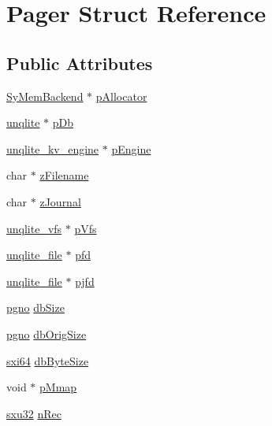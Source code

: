 \hypertarget{struct_pager}{\section{Pager Struct Reference}
\label{d0/dba/struct_pager}
}
\subsection*{Public Attributes}
\begin{DoxyCompactItemize}
\item 
\hyperlink{struct_sy_mem_backend}{Sy\-Mem\-Backend} $\ast$ \hyperlink{struct_pager_ac763b64b0ff65ebda65c6ddb4a79c673}{p\-Allocator}
\item 
\hyperlink{structunqlite}{unqlite} $\ast$ \hyperlink{struct_pager_af0cd7032701f31fc96e7912016c07aae}{p\-Db}
\item 
\hyperlink{structunqlite__kv__engine}{unqlite\-\_\-kv\-\_\-engine} $\ast$ \hyperlink{struct_pager_a15d841c0957a25122ad101ab6452ced0}{p\-Engine}
\item 
char $\ast$ \hyperlink{struct_pager_a2a55a044468f8658b7993e57087a5561}{z\-Filename}
\item 
char $\ast$ \hyperlink{struct_pager_ab36ce1f606c407ad3fc56a3651f5a319}{z\-Journal}
\item 
\hyperlink{structunqlite__vfs}{unqlite\-\_\-vfs} $\ast$ \hyperlink{struct_pager_af8726806e509aa9ffadbec33d8fd5db3}{p\-Vfs}
\item 
\hyperlink{structunqlite__file}{unqlite\-\_\-file} $\ast$ \hyperlink{struct_pager_af9208754978a6d024387dba841a161a4}{pfd}
\item 
\hyperlink{structunqlite__file}{unqlite\-\_\-file} $\ast$ \hyperlink{struct_pager_a08b938bade1e4ea6f8d5d1a828b692d3}{pjfd}
\item 
\hyperlink{unqlite_8c_a90bf132c9229151f7c29e84e592907cd}{pgno} \hyperlink{struct_pager_ab7ffb34750348f688f5aab803b20e99b}{db\-Size}
\item 
\hyperlink{unqlite_8c_a90bf132c9229151f7c29e84e592907cd}{pgno} \hyperlink{struct_pager_a701f357add2315f86d1529d41aa0d703}{db\-Orig\-Size}
\item 
\hyperlink{unqlite_8c_a7913a13763a99412223d5dfa1829dd73}{sxi64} \hyperlink{struct_pager_a1c9e52247b26f6df497c920d4aaac0c4}{db\-Byte\-Size}
\item 
void $\ast$ \hyperlink{struct_pager_ada2a7495dd32467ba381a4ea95f5471c}{p\-Mmap}
\item 
\hyperlink{unqlite_8c_abc5a8a3f345c200c98c485551f49666e}{sxu32} \hyperlink{struct_pager_aa6889a81613a7b9c8999390e0111dc37}{n\-Rec}

\end{DoxyCompactItemize}
